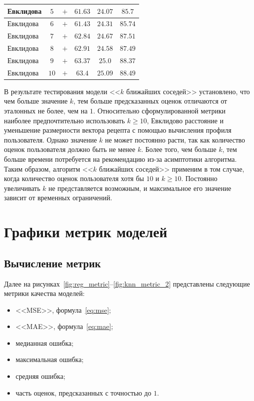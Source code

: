 \begin{table}[H]
\begin{tabular}{|l|c|c|c|c|c|}
Евклидова & $5$ & $+$ & $61{.}63$ & $24{.}07$ & $85{.}7$ \\ \hline
Евклидова & $6$ & $+$ & $61{.}43$ & $24{.}31$ & $85{.}74$ \\ \hline
Евклидова & $7$ & $+$ & $62{.}84$ & $24{.}67$ & $87{.}51$ \\ \hline
Евклидова & $8$ & $+$ & $62{.}91$ & $24{.}58$ & $87{.}49$ \\ \hline
Евклидова & $9$ & $+$ & $63{.}37$ & $25{.}0$ & $88{.}37$ \\ \hline
Евклидова & $10$ & $+$ & $63{.}4$ & $25{.}09$ & $88{.}49$ \\ \hline
\end{tabular}
\label{tab:knn_model}
\end{table}

В результате тестирования модели <<$k$ ближайших соседей>> установлено, что чем больше значение $k$, тем больше предсказанных оценок отличаются от эталонных не более, чем на $1$.
Относительно сформулированной метрики наиболее предпочтительно использовать $k \geqslant 10$, Евклидово расстояние и уменьшение размерности вектора рецепта с помощью вычисления профиля пользователя.
Однако значение $k$ не может постоянно расти, так как количество оценок пользователя должно быть не менее $k$.
Более того, чем больше $k$, тем больше времени потребуется на рекомендацию из-за асимптотики алгоритма.
Таким образом, алгоритм <<$k$ ближайших соседей>> применим в том случае, когда количество оценок пользователя хотя бы $10$ и $k \geqslant 10$.
Постоянно увеличивать $k$ не представляется возможным, и максимальное его значение зависит от временных ограничений. 

\section{Графики метрик моделей}
\subsection{Вычисление метрик}
Далее на рисунках~\ref{fig:reg_metric}--\ref{fig:knn_metric_2} представлены следующие метрики качества моделей:
\begin{itemize}
	\item <<MSE>>, формула~\eqref{eq:mse};
	\item <<MAE>>, формула~\eqref{eq:mae};
	\item медианная ошибка;
	\item максимальная ошибка;
	\item средняя ошибка;
	\item часть оценок, предсказанных с точностью до $1$.
\end{itemize}

